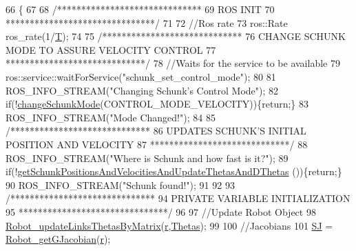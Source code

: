\begin{DoxyCode}
66                                            \{
67 
68         \textcolor{comment}{/******************************}
69 \textcolor{comment}{                                ROS INIT}
70 \textcolor{comment}{        *******************************/}
71 
72         \textcolor{comment}{//Ros rate}
73         ros::Rate ros\_rate(1/\hyperlink{classCartesian__controller_a35c6ddbb9624878f2807ff644a33e832}{T});
74 
75         \textcolor{comment}{/*****************************}
76 \textcolor{comment}{           CHANGE SCHUNK MODE TO ASSURE VELOCITY CONTROL}
77 \textcolor{comment}{         *****************************/}
78         \textcolor{comment}{//Waits for the service to be available}
79         ros::service::waitForService(\textcolor{stringliteral}{"schunk\_set\_control\_mode"});
80 
81         ROS\_INFO\_STREAM(\textcolor{stringliteral}{"Changing Schunk's Control Mode"});
82         \textcolor{keywordflow}{if}(!\hyperlink{classCartesian__controller_aaf006f80e89c08cf040956afbb4cf3c0}{changeSchunkMode}(CONTROL\_MODE\_VELOCITY))\{\textcolor{keywordflow}{return};\}
83         ROS\_INFO\_STREAM(\textcolor{stringliteral}{"Mode Changed!"});
84 
85         \textcolor{comment}{/*****************************}
86 \textcolor{comment}{           UPDATES SCHUNK'S INITIAL POSITION AND VELOCITY}
87 \textcolor{comment}{         *****************************/}
88         ROS\_INFO\_STREAM(\textcolor{stringliteral}{"Where is Schunk and how fast is it?"});
89         \textcolor{keywordflow}{if}(!\hyperlink{classCartesian__controller_a0d7a63bac84715f6742db738df246f91}{getSchunkPositionsAndVelocitiesAndUpdateThetasAndDThetas}
      ())\{\textcolor{keywordflow}{return};\}
90         ROS\_INFO\_STREAM(\textcolor{stringliteral}{"Schunk found!"});
91 
92 
93         \textcolor{comment}{/******************************}
94 \textcolor{comment}{        PRIVATE VARIABLE INITIALIZATION}
95 \textcolor{comment}{        *******************************/}
96 
97         \textcolor{comment}{//Update Robot Object}
98         \hyperlink{robot_8h_aa1d3aca5132bd5f347f5966d38fbb966}{Robot\_updateLinksThetasByMatrix}(\hyperlink{classCartesian__controller_a5562129951bd802e4ded77fc716c87a0}{r},\hyperlink{classCartesian__controller_a0a0f818dad601cd9e3e26cb6959b8eb6}{Thetas});
99 
100         \textcolor{comment}{//Jacobians}
101         \hyperlink{classCartesian__controller_a98fdac06d136ac3dba0102d97cd5dd36}{SJ}  = \hyperlink{robot_8h_a61464c237c56f3db3f79b0350df80ddb}{Robot\_getGJacobian}(\hyperlink{classCartesian__controller_a5562129951bd802e4ded77fc716c87a0}{r});

\end{DoxyCode}
